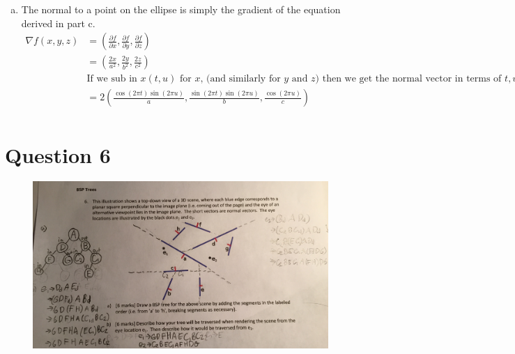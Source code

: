 \documentclass{article} %
\begin{document}
\begin{enumerate}[a)]
\item
The normal to a point on the ellipse is simply the gradient of the equation derived in part c.
\begin{align*}
\nabla f(x,y,z) &= \left(\frac{\partial f}{\partial x},\frac{\partial f}{\partial y},\frac{\partial f}{\partial z}\right)\\
&= \left(\frac{2x}{a^2},\frac{2y}{b^2},\frac{2z}{c^2}\right)\\
&\text{If we sub in $x(t,u)$ for $x$, (and similarly for $y$ and $z$) then we get the normal vector in terms of $t,u$}\\
&= 2 \left(\frac{\cos(2 \pi t) \sin(2 \pi u)}{a},\frac{\sin(2 \pi t) \sin(2 \pi u)}{b},\frac{\cos(2 \pi u)}{c}\right)\\
\end{align*}

\end{enumerate}



\section{Question 6}
\begin{figure}[h!]
\centering
	\includegraphics[width=\textwidth]{q6}
\end{figure}
\end{document}
